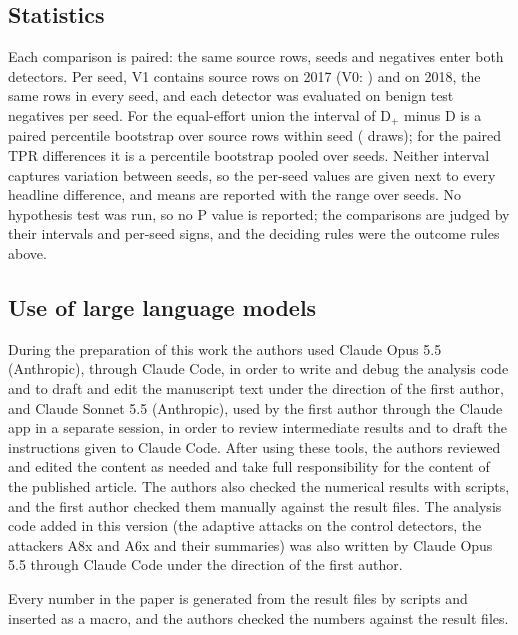 \subsection*{Statistics}
\label{sec:statistics}
Each comparison is paired: the same source rows, seeds and negatives enter both detectors.
Per seed, V1 contains \nSrcVoneSeventeen{} source rows on 2017 (V0: \nSrcVzeroSeventeen) and \nSrcVoneEighteen{} on
2018, the same rows in every seed, and each detector was evaluated on \paramNegTest{} benign test negatives per seed.
For the equal-effort union the \paramCILevel{} interval of D$_+$ minus D is a paired percentile bootstrap over source
rows within seed (\paramBoot{} draws); for the paired TPR differences it is a percentile bootstrap pooled over seeds.
Neither interval captures variation between seeds, so the per-seed values are given next to every headline
difference, and means are reported with the range over seeds.
No hypothesis test was run, so no P value is reported; the comparisons are judged by their intervals and per-seed
signs, and the deciding rules were the outcome rules above.

\subsection*{Use of large language models}
\label{sec:llm}
During the preparation of this work the authors used Claude Opus 5.5 (Anthropic), through Claude Code, in order to write
and debug the analysis code and to draft and edit the manuscript text under the direction of the first author, and
Claude Sonnet 5.5 (Anthropic), used by the first author through the Claude app in a separate session, in order to review
intermediate results and to draft the instructions given to Claude Code.
After using these tools, the authors reviewed and edited the content as needed and take full responsibility for the
content of the published article.
The authors also checked the numerical results with scripts, and the first author checked them manually against the
result files.
The analysis code added in this version (the adaptive attacks on the control detectors, the attackers A8x and A6x
and their summaries) was also written by Claude Opus 5.5 through Claude Code under the direction of the first author.

Every number in the paper is generated from the result files by scripts and inserted as a macro, and the authors checked the numbers against the result files.
